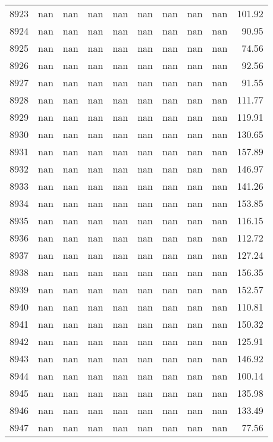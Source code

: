 \begin{tabular}{lrrrrrrrrr}
8923 & nan & nan & nan & nan & nan & nan & nan & nan & 101.92 \\
8924 & nan & nan & nan & nan & nan & nan & nan & nan & 90.95 \\
8925 & nan & nan & nan & nan & nan & nan & nan & nan & 74.56 \\
8926 & nan & nan & nan & nan & nan & nan & nan & nan & 92.56 \\
8927 & nan & nan & nan & nan & nan & nan & nan & nan & 91.55 \\
8928 & nan & nan & nan & nan & nan & nan & nan & nan & 111.77 \\
8929 & nan & nan & nan & nan & nan & nan & nan & nan & 119.91 \\
8930 & nan & nan & nan & nan & nan & nan & nan & nan & 130.65 \\
8931 & nan & nan & nan & nan & nan & nan & nan & nan & 157.89 \\
8932 & nan & nan & nan & nan & nan & nan & nan & nan & 146.97 \\
8933 & nan & nan & nan & nan & nan & nan & nan & nan & 141.26 \\
8934 & nan & nan & nan & nan & nan & nan & nan & nan & 153.85 \\
8935 & nan & nan & nan & nan & nan & nan & nan & nan & 116.15 \\
8936 & nan & nan & nan & nan & nan & nan & nan & nan & 112.72 \\
8937 & nan & nan & nan & nan & nan & nan & nan & nan & 127.24 \\
8938 & nan & nan & nan & nan & nan & nan & nan & nan & 156.35 \\
8939 & nan & nan & nan & nan & nan & nan & nan & nan & 152.57 \\
8940 & nan & nan & nan & nan & nan & nan & nan & nan & 110.81 \\
8941 & nan & nan & nan & nan & nan & nan & nan & nan & 150.32 \\
8942 & nan & nan & nan & nan & nan & nan & nan & nan & 125.91 \\
8943 & nan & nan & nan & nan & nan & nan & nan & nan & 146.92 \\
8944 & nan & nan & nan & nan & nan & nan & nan & nan & 100.14 \\
8945 & nan & nan & nan & nan & nan & nan & nan & nan & 135.98 \\
8946 & nan & nan & nan & nan & nan & nan & nan & nan & 133.49 \\
8947 & nan & nan & nan & nan & nan & nan & nan & nan & 77.56 \\

\end{tabular}
